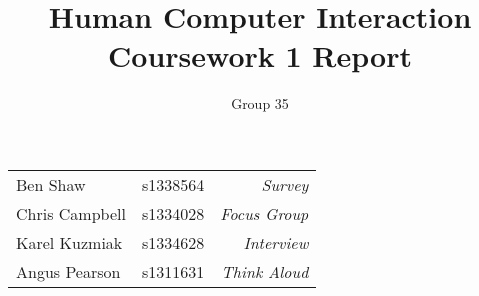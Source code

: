 \documentclass[a4paper, notoc]{tufte-handout}
\title{Human Computer Interaction\\ Coursework 1 Report}
\author{Group 35}
\begin{document}
\maketitle %
\vspace{1em}
\noindent
\begin{tabular}{l l r}
  Ben Shaw       & s1338564 & \textit{Survey}\\
  Chris Campbell & s1334028 & \textit{Focus Group}\\
  Karel Kuzmiak  & s1334628 & \textit{Interview}\\
  Angus Pearson  & s1311631 & \textit{Think Aloud}\\
\end{tabular}

\tableofcontents
\newpage

%








%
%
\end{document}
